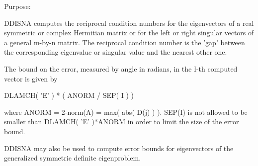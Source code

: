  \begin{DoxyParagraph}{Purpose\+: }
\begin{DoxyVerb} DDISNA computes the reciprocal condition numbers for the eigenvectors
 of a real symmetric or complex Hermitian matrix or for the left or
 right singular vectors of a general m-by-n matrix. The reciprocal
 condition number is the 'gap' between the corresponding eigenvalue or
 singular value and the nearest other one.

 The bound on the error, measured by angle in radians, in the I-th
 computed vector is given by

        DLAMCH( 'E' ) * ( ANORM / SEP( I ) )

 where ANORM = 2-norm(A) = max( abs( D(j) ) ).  SEP(I) is not allowed
 to be smaller than DLAMCH( 'E' )*ANORM in order to limit the size of
 the error bound.

 DDISNA may also be used to compute error bounds for eigenvectors of
 the generalized symmetric definite eigenproblem.\end{DoxyVerb}
 
\end{DoxyParagraph}

